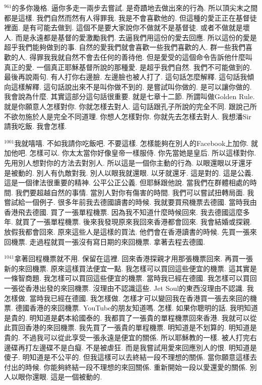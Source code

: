 \documentclass{book}
\begin{document}
$^{961}$的多你幾格.
逼你多走一兩步去嘗試.
是奇蹟地去做出來的行為.
所以頂尖末之間都是這樣.
我們自然而然有人得罪我.
我是不會喜歡他的.
但這種的愛正正在基督徒裡面.
是有可能去做到.
這個不是要大家說你不做就不是基督徒.
或者不做就是壞人.
而是永遠都是基督的愛激勵我們.
去逼我們用這份的愛去回應.
所以這份的愛是超乎我們能夠做到的事.
自然的愛我們就會喜歡一些我們喜歡的人.
群一些我們喜歡的人.
得罪我我就自然不會去任何的善待他.
但是愛受的這個命令告訴他什麼叫真正的愛.
一個真正耶穌基督所說的那種愛.
是超乎我們自然.
我們不可能做到的.
最後再說兩句.
有人打你右邊臉.
左邊臉也被人打了.
這句話怎麼解釋.
這句話我傾向這樣解釋.
這句話說出來不是叫你做不到的.
是嘗試叫你做的.
是可以讓你做的.
我會說為什麼.
其實這部分這句話很重要.
就是七章十二節.
所謂叫做Golden Rule.
就是你願意人怎樣對你.
你就怎樣去對人.
這句話跟孔子所說的完全不同.
跟說己所不欲勿施於人是完全不同道理.
你想人怎樣對你.
你就先去怎樣去對人.
我想潘Sir請我吃飯.
我會怎樣.

$^{1001}$我就嘻嘻.
不如我請你吃飯吧.
不要這樣.
怎樣能夠在別人的Facebook上加你.
就加他吧.
怎樣可以.
你太太當你好像皇帝一樣服侍.
你先當她是皇后.
所以這樣對你.
先用別人想對你的方法去對別人.
所以這是一個你主動的行為.
以眼還眼以牙還牙是被動的.
別人有仇敵對我.
別人以眼我就還眼.
以牙就還牙.
這是對的.
這是公義.
這是一個律法很重要的精神.
公平公正公義.
但耶穌跟他說.
當我們在群體相處的時間.
我們要超越自然的事情.
當別人對你有傷害的時間.
我們可以嘗試扭轉局面.
我嘗試給一個例子.
很多年前我去德國讀書的時候.
我就要買飛機票去德國.
當時我由香港飛去德國.
買了一張單程機票.
因為我不知道什麼時候回來.
我去德國這麼多年.
就買了一張單程機票.
後來我發現原來我回來香港都會回來.
我會結婚或探親.
放假我都會回來.
原來這些人是這樣的買法.
他們會在香港讀書的時候.
先買一張來回機票.
走過程就買一張沒有寫日期的來回機票.
拿著去程去德國.

$^{1041}$拿著回程機票就不用.
保留在這裡.
回來香港探親才用那張機票回來.
再買一張新的來回機票.
原來這樣買法便宜一點.
我怎樣可以買回這些便宜的機票.
這其實是一條智商題.
我怎樣可以買回這些便宜的機票.
當時我已經在德國.
我怎樣可以買回一張從香港出發的來回機票.
沒理由不認識這些.
Jet Soul的東西沒理由不認識.
我怎樣做.
當時我已經在德國.
我怎樣做.
怎樣才可以變回我在香港買一張去來回的機票.
德國香港的來回機票.
YouTube的朋友知道嗎.
怎樣.
如果你聰明的話.
我明知道是貴的.
明知道是虧本給國泰的.
我都買了一張貴的單程機票回來香港.
我就可以從此買回香港的來回機票.
我先買了一張貴的單程機票.
明知道是不划算的.
明知道是貴的.
不過我可以從此享受一張永遠是便宜的關係.
所以耶穌教的一樣.
被人打完右邊碟再打左邊碟不是白癡.
不是被虐狂.
而是我嘗試用愛來回應別人的恨.
明知道是傻子.
明知道是不公平的.
但我這樣可以去終結一段不理想的關係.
當你願意這樣去付出的時候.
你能夠終結一段不理想的來回關係.
重新開始一段以愛還愛的關係.
別人以眼你還眼.
這是一個被動的.
\end{document}

